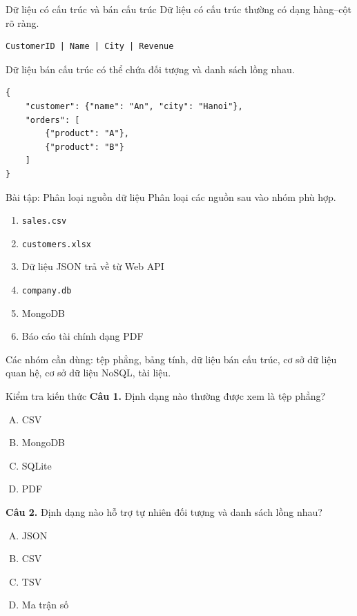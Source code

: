 \documentclass[aspectratio=169,11pt]{beamer}
\newcommand{\code}[1]{\texttt{#1}}
\newcommand{\smallgap}{\vspace{0.4em}}
\begin{document}
\begin{frame}[fragile]{Dữ liệu có cấu trúc và bán cấu trúc}
Dữ liệu có cấu trúc thường có dạng hàng--cột rõ ràng.
\begin{lstlisting}[style=textstyle]
CustomerID | Name | City | Revenue
\end{lstlisting}

Dữ liệu bán cấu trúc có thể chứa đối tượng và danh sách lồng nhau.
\begin{lstlisting}[style=pythonstyle]
{
    "customer": {"name": "An", "city": "Hanoi"},
    "orders": [
        {"product": "A"},
        {"product": "B"}
    ]
}
\end{lstlisting}
\end{frame}

\begin{frame}{Bài tập: Phân loại nguồn dữ liệu}
Phân loại các nguồn sau vào nhóm phù hợp.
\begin{enumerate}
  \item \code{sales.csv}
  \item \code{customers.xlsx}
  \item Dữ liệu JSON trả về từ Web API
  \item \code{company.db}
  \item MongoDB
  \item Báo cáo tài chính dạng PDF
\end{enumerate}

\smallgap
Các nhóm cần dùng: tệp phẳng, bảng tính, dữ liệu bán cấu trúc, cơ sở dữ liệu quan hệ, cơ sở dữ liệu NoSQL, tài liệu.
\end{frame}

\begin{frame}{Kiểm tra kiến thức}
\textbf{Câu 1.} Định dạng nào thường được xem là tệp phẳng?
\begin{enumerate}[A.]
  \item CSV
  \item MongoDB
  \item SQLite
  \item PDF
\end{enumerate}

\smallgap
\textbf{Câu 2.} Định dạng nào hỗ trợ tự nhiên đối tượng và danh sách lồng nhau?
\begin{enumerate}[A.]
  \item JSON
  \item CSV
  \item TSV
  \item Ma trận số
\end{enumerate}
\end{frame}
\end{document}
